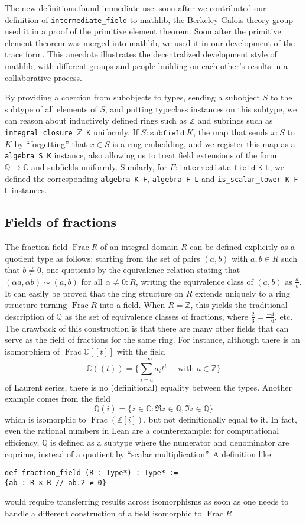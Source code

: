 \documentclass[a4paper,USenglish,cleveref, autoref, thm-restate]{lipics-v2021}
\newcommand{\C}{\mathbb{C}}
\newcommand{\lean}[1]{\texttt{#1}\xspace} %
\newcommand{\mathlib}{\textsf{mathlib}\xspace}
\newcommand{\Q}{\mathbb{Q}}
\newcommand{\Z}{\mathbb{Z}}
\DeclareMathOperator{\Frac}{Frac}
\begin{document}
The new definitions found immediate use:
soon after we contributed our definition of \lean{intermediate\_field} to \mathlib,
the Berkeley Galois theory group used it in a proof of the primitive element theorem.
Soon after the primitive element theorem was merged into \mathlib,
we used it in our development of the trace form.
This anecdote illustrates the decentralized development style of \mathlib,
with different groups and people building on each other's results in a collaborative process.

By providing a coercion from subobjects to types, sending a subobject $S$ to the subtype of all elements of $S$,
and putting typeclass instances on this subtype,
we can reason about inductively defined rings such as $\Z$ and subrings such as \lean{integral\_closure $\Z$ K} uniformly.
If $S : \lean{subfield}\ K$, the map that sends $x : S$ to $K$ by ``forgetting'' that $x \in S$ is a ring embedding,
and we register this map as a \lean{algebra S K} instance, also allowing us to treat field extensions of the form $\Q \to \C$ and subfields uniformly.
Similarly, for $F : \lean{intermediate\_field K L}$, we defined the corresponding \lean{algebra K F}, \lean{algebra F L} and \lean{is\_scalar\_tower K F L} instances.

\subsection{Fields of fractions}\label{subsection : fields of fractions}
The fraction field $\Frac R$ of an integral domain $R$ can be defined explicitly as a quotient type as follows:
starting from the set of pairs $(a,b)$ with $a,b \in R$ such that $b\neq 0$,
one quotients by the equivalence relation stating that $(\alpha a, \alpha b) \sim (a,b)$ for all $\alpha \ne 0 : R$, writing the equivalence class of $(a,b)$ as $\frac{a}{b}$.
It can easily be proved that the ring structure on $R$ extends uniquely to a ring structure turning $\Frac R$ into a field.
When $R=\Z$, this yields the traditional description of $\Q$ as the set of equivalence classes of fractions, where $\frac{2}{3}=\frac{-4}{-6}$, etc.
The drawback of this construction is that there are many other fields that can serve as the field of fractions for the same ring.
For instance, although there is an isomorphism of $\Frac \C[\![t]\!]$ with the field
\[
\C(\!(t)\!)=\Big\{\sum_{i=a}^{+\infty} a_it^i\quad\text{ with }a \in \Z\Big\}
\]
of Laurent series, there is no (definitional) equality between the types. Another example comes from the field
\[
\Q(i)=\{z \in \C : \Re z \in \Q, \Im z\in\Q\}
\]
which is isomorphic to $\Frac (\Z[i])$, but not definitionally equal to it.
In fact, even the rational numbers in Lean are a counterexample:
for computational efficiency, $\Q$ is defined as a subtype where the numerator and denominator are coprime,
instead of a quotient by ``scalar multiplication''. A definition like
\begin{lstlisting}
def fraction_field (R : Type*) : Type* :=
{ab : R × R // ab.2 ≠ 0}
\end{lstlisting}
would require transferring results across isomorphisms as soon as one needs to handle a different construction of a field isomorphic to $\Frac R$.
\end{document}
